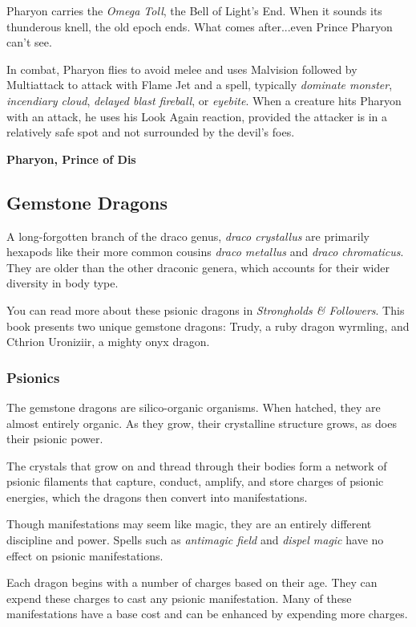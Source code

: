 \documentclass[10pt,a4paper,twoside,bg=print,twocolumn,openany,nodeprecatedcode]{dndbook}
\begin{document}
Pharyon carries the \textit{Omega Toll}, the Bell of Light's End. When it sounds its thunderous knell, the old epoch ends. What comes after...even Prince Pharyon can't see.

In combat, Pharyon flies to avoid melee and uses Malvision followed by Multiattack to attack with Flame Jet and a spell, typically \textit{dominate monster}, \textit{incendiary cloud}, \textit{delayed blast fireball}, or \textit{eyebite}. When a creature hits Pharyon with an attack, he uses his Look Again reaction, provided the attacker is in a relatively safe spot and not surrounded by the devil's foes.

\textbf{Pharyon, Prince of Dis}

\subsection{Gemstone Dragons}
A long-forgotten branch of the draco genus, \textit{draco crystallus} are primarily hexapods like their more common cousins \textit{draco metallus} and \textit{draco chromaticus}. They are older than the other draconic genera, which accounts for their wider diversity in body type.

You can read more about these psionic dragons in \textit{Strongholds \& Followers}. This book presents two unique gemstone dragons: Trudy, a ruby dragon wyrmling, and Cthrion Uroniziir, a mighty onyx dragon.

\subsubsection{Psionics}
The gemstone dragons are silico-organic organisms. When hatched, they are almost entirely organic. As they grow, their crystalline structure grows, as does their psionic power.

The crystals that grow on and thread through their bodies form a network of psionic filaments that capture, conduct, amplify, and store charges of psionic energies, which the dragons then convert into manifestations.

Though manifestations may seem like magic, they are an entirely different discipline and power. Spells such as \textit{antimagic field} and \textit{dispel magic} have no effect on psionic manifestations.

Each dragon begins with a number of charges based on their age. They can expend these charges to cast any psionic manifestation. Many of these manifestations have a base cost and can be enhanced by expending more charges.
\end{document}
